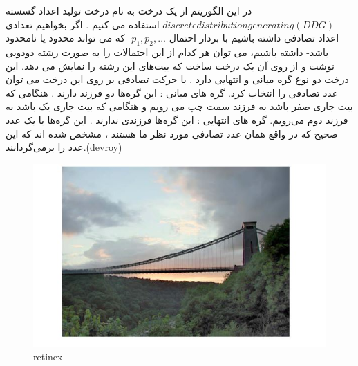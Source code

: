 
در این الگوریتم از یک درخت به نام درخت تولید اعداد گسسته  $discrete distribution generating (DDG)$   استفاده می کنیم . 
اگر  بخواهیم تعدادی اعداد  تصادفی داشته باشیم با بردار احتمال $p_{1}, p_{2}, ...$ -که می تواند محدود یا نامحدود باشد- داشته باشیم، می توان هر کدام از این احتمالات را به صورت رشته دودویی نوشت و از روی آن یک درخت ساخت که بیت‌های این رشته را نمایش می دهد. این درخت دو نوع گره میانی و انتهایی دارد . با حرکت تصادفی بر روی این درخت می توان عدد تصادفی را انتخاب کرد. 
 گره های میانی : این گره‌ها دو فرزند دارند . هنگامی که بیت جاری صفر باشد به فرزند سمت چپ می رویم و هنگامی که بیت جاری یک باشد به فرزند دوم می‌رویم. 
 گره های انتهایی : این گره‌ها فرزندی ندارند . این گره‌ها با یک عدد صحیح  که در واقع همان عدد تصادفی مورد نظر ما هستند ، مشخص شده اند که این عدد را برمی‌گردانند.(devroy)

      \begin{figure}[!htb]
      	\includegraphics[width=\linewidth]{images/retinex1}
      	\caption{retinex}\label{fig:logtonemap}
      	\endminipage\hfill
      \end{figure}
      
